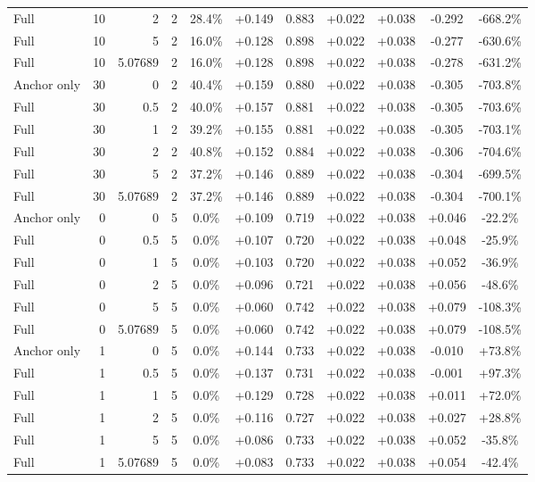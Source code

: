 \begin{table}[htbp]
\begin{tabular}{lrrrccccccc}
Full & 10 & 2 & 2 & 28.4\% & +0.149 & 0.883 & +0.022 & +0.038 & -0.292 & -668.2\% \\
Full & 10 & 5 & 2 & 16.0\% & +0.128 & 0.898 & +0.022 & +0.038 & -0.277 & -630.6\% \\
Full & 10 & 5.07689 & 2 & 16.0\% & +0.128 & 0.898 & +0.022 & +0.038 & -0.278 & -631.2\% \\
Anchor only & 30 & 0 & 2 & 40.4\% & +0.159 & 0.880 & +0.022 & +0.038 & -0.305 & -703.8\% \\
Full & 30 & 0.5 & 2 & 40.0\% & +0.157 & 0.881 & +0.022 & +0.038 & -0.305 & -703.6\% \\
Full & 30 & 1 & 2 & 39.2\% & +0.155 & 0.881 & +0.022 & +0.038 & -0.305 & -703.1\% \\
Full & 30 & 2 & 2 & 40.8\% & +0.152 & 0.884 & +0.022 & +0.038 & -0.306 & -704.6\% \\
Full & 30 & 5 & 2 & 37.2\% & +0.146 & 0.889 & +0.022 & +0.038 & -0.304 & -699.5\% \\
Full & 30 & 5.07689 & 2 & 37.2\% & +0.146 & 0.889 & +0.022 & +0.038 & -0.304 & -700.1\% \\
Anchor only & 0 & 0 & 5 & 0.0\% & +0.109 & 0.719 & +0.022 & +0.038 & +0.046 & -22.2\% \\
Full & 0 & 0.5 & 5 & 0.0\% & +0.107 & 0.720 & +0.022 & +0.038 & +0.048 & -25.9\% \\
Full & 0 & 1 & 5 & 0.0\% & +0.103 & 0.720 & +0.022 & +0.038 & +0.052 & -36.9\% \\
Full & 0 & 2 & 5 & 0.0\% & +0.096 & 0.721 & +0.022 & +0.038 & +0.056 & -48.6\% \\
Full & 0 & 5 & 5 & 0.0\% & +0.060 & 0.742 & +0.022 & +0.038 & +0.079 & -108.3\% \\
Full & 0 & 5.07689 & 5 & 0.0\% & +0.060 & 0.742 & +0.022 & +0.038 & +0.079 & -108.5\% \\
Anchor only & 1 & 0 & 5 & 0.0\% & +0.144 & 0.733 & +0.022 & +0.038 & -0.010 & +73.8\% \\
Full & 1 & 0.5 & 5 & 0.0\% & +0.137 & 0.731 & +0.022 & +0.038 & -0.001 & +97.3\% \\
Full & 1 & 1 & 5 & 0.0\% & +0.129 & 0.728 & +0.022 & +0.038 & +0.011 & +72.0\% \\
Full & 1 & 2 & 5 & 0.0\% & +0.116 & 0.727 & +0.022 & +0.038 & +0.027 & +28.8\% \\
Full & 1 & 5 & 5 & 0.0\% & +0.086 & 0.733 & +0.022 & +0.038 & +0.052 & -35.8\% \\
Full & 1 & 5.07689 & 5 & 0.0\% & +0.083 & 0.733 & +0.022 & +0.038 & +0.054 & -42.4\% \\

\end{tabular}
\end{table}
